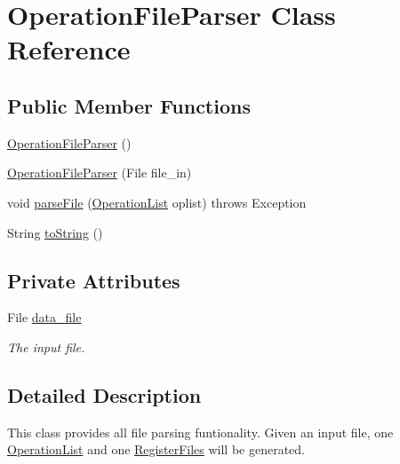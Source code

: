 \hypertarget{classOperationFileParser}{\section{\-Operation\-File\-Parser \-Class \-Reference}
\label{classOperationFileParser}
}
\subsection*{\-Public \-Member \-Functions}
\begin{DoxyCompactItemize}
\item 
\hyperlink{classOperationFileParser_aae642f641952d9299ae1d18c2a98e257}{\-Operation\-File\-Parser} ()
\item 
\hyperlink{classOperationFileParser_a72d440d15d9a5006fc7f4906a7ffa0ac}{\-Operation\-File\-Parser} (\-File file\-\_\-in)
\item 
void \hyperlink{classOperationFileParser_a2cd6d5ec8a1c1124ea27e3810ec8ac8c}{parse\-File} (\hyperlink{classOperationList}{\-Operation\-List} oplist)  throws Exception
\item 
\-String \hyperlink{classOperationFileParser_af6e91ca0ed2166c6b75ad12574dc5341}{to\-String} ()
\end{DoxyCompactItemize}
\subsection*{\-Private \-Attributes}
\begin{DoxyCompactItemize}
\item 
\-File \hyperlink{classOperationFileParser_a176adcf1b7c4ff076e46053f40ccdfce}{data\-\_\-file}
\begin{DoxyCompactList}\small\item\em \-The input file. \end{DoxyCompactList}\end{DoxyCompactItemize}


\subsection{\-Detailed \-Description}
\-This class provides all file parsing funtionality. \-Given an input file, one \hyperlink{classOperationList}{\-Operation\-List} and one \hyperlink{classRegisterFiles}{\-Register\-Files} will be generated. 

